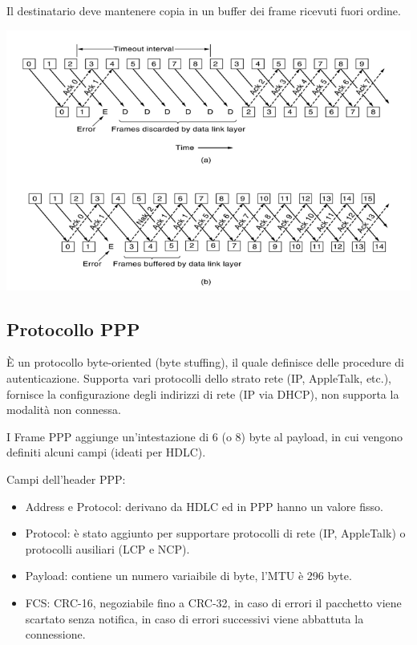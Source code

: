             Il destinatario deve mantenere copia in un buffer dei frame ricevuti fuori ordine.

            \begin{center}
                \includegraphics[scale=0.48]{chapters/3/assets/schema_k.png}
            \end{center}

    \subsection{Protocollo PPP}
        È un protocollo byte-oriented (byte stuffing), il quale definisce delle procedure di autenticazione. Supporta vari protocolli dello strato rete (IP, AppleTalk, etc.), fornisce la configurazione degli indirizzi di rete (IP via DHCP), non supporta la modalità non connessa.

        I Frame PPP aggiunge un'intestazione di 6 (o 8) byte al payload, in cui vengono definiti alcuni campi (ideati per HDLC).

        

        Campi dell'header PPP:
        \begin{itemize}
            \item Address e Protocol: derivano da HDLC ed in PPP hanno un valore fisso.
            \item Protocol: è stato aggiunto per supportare protocolli di rete (IP, AppleTalk) o protocolli ausiliari (LCP e NCP).
            \item Payload: contiene un numero variaibile di byte, l'MTU è 296 byte.
            \item FCS: CRC-16, negoziabile fino a CRC-32, in caso di errori il pacchetto viene scartato senza notifica, in caso di errori successivi viene abbattuta la connessione.
        \end{itemize}

